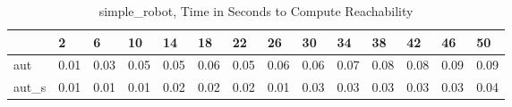 \begin{table}
\caption{simple_robot, Time in Seconds to Compute Reachability}
\label{simple_robot_states_time}
\begin{tabular}{llllllllllllll}
\toprule
 & 2 & 6 & 10 & 14 & 18 & 22 & 26 & 30 & 34 & 38 & 42 & 46 & 50 \\
\midrule
aut & 0.01 & 0.03 & 0.05 & 0.05 & 0.06 & 0.05 & 0.06 & 0.06 & 0.07 & 0.08 & 0.08 & 0.09 & 0.09 \\
aut_s & 0.01 & 0.01 & 0.01 & 0.02 & 0.02 & 0.02 & 0.01 & 0.03 & 0.03 & 0.03 & 0.03 & 0.03 & 0.04 \\
\bottomrule
\end{tabular}
\end{table}
